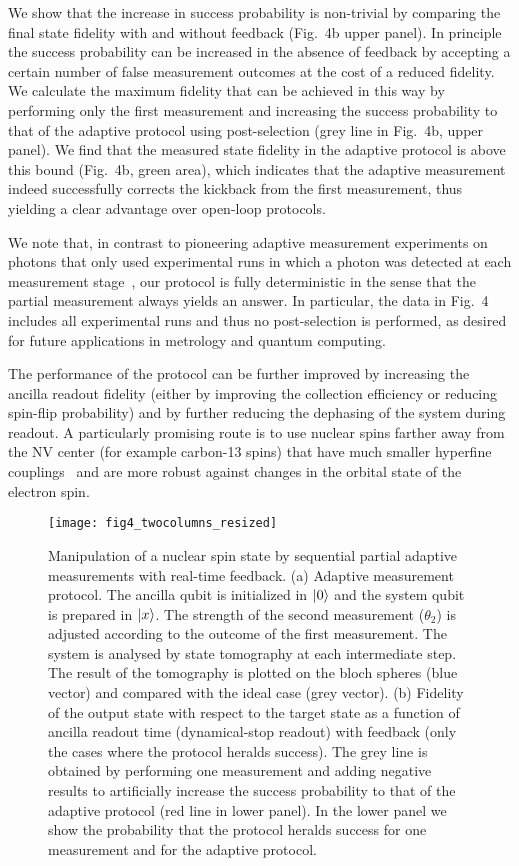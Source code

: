 We show that the increase in success probability is non-trivial by comparing the final state fidelity with and without feedback (Fig.~4b upper panel). In principle the success probability can be increased in the absence of feedback by accepting a certain number of false measurement outcomes at the cost of a reduced fidelity. We calculate the maximum fidelity that can be achieved in this way by performing only the first measurement and increasing the success probability to that of the adaptive protocol using post-selection (grey line in Fig.~4b, upper panel). We find that the measured state fidelity in the adaptive protocol is above this bound (Fig.~4b, green area), which indicates that the adaptive measurement indeed successfully corrects the kickback from the first measurement, thus yielding a clear advantage over open-loop protocols.

We note that, in contrast to pioneering adaptive measurement experiments on photons that only used experimental runs in which a photon was detected at each measurement stage~\cite{Prevedel_Nature_2007}, our protocol is fully deterministic in the sense that the partial measurement always yields an answer. In particular, the data in Fig.~4 includes all experimental runs and thus no post-selection is performed, as desired for future applications in metrology and quantum computing. 

The performance of the protocol can be further improved by increasing the ancilla readout fidelity (either by improving the collection efficiency or reducing spin-flip probability) and by further reducing the dephasing of the system during readout. A particularly promising route is to use nuclear spins farther away from the NV center (for example carbon-13 spins) that have much smaller hyperfine couplings~\cite{Zhao_NatureNano_2012,Taminiau_PRL_2012,Kolkowitz_PRL_2012} and are more robust against changes in the orbital state of the electron spin.

\begin{figure*}
	\texttt{[image: fig4\_twocolumns\_resized]}
	\caption{\label{fig4} Manipulation of a nuclear spin state by sequential partial adaptive measurements with real-time feedback. (a) Adaptive measurement protocol. The ancilla qubit is initialized in $\left|0\right\rangle$ and the system qubit is prepared in $\left|x\right\rangle$. The strength of the second measurement ($\theta_2$) is adjusted according to the outcome of the first measurement. The system is analysed by state tomography at each intermediate step. The result of the tomography is plotted on the bloch spheres (blue vector) and compared with the ideal case (grey vector). (b) Fidelity of the output state with respect to the target state as a function of ancilla readout time (dynamical-stop readout) with feedback (only the cases where the protocol heralds success). The grey line is obtained by performing one measurement and adding negative results to artificially increase the success probability to that of the adaptive protocol (red line in lower panel). In the lower panel we show the probability that the protocol heralds success for one measurement and for the adaptive protocol.  }
\end{figure*}

